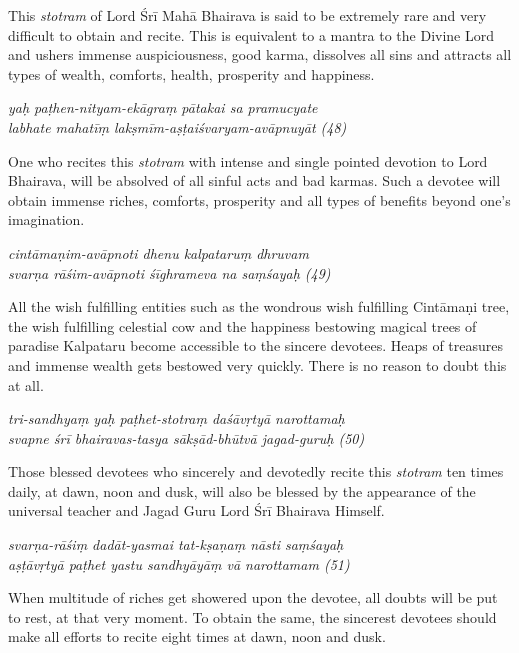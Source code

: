 \documentclass[11pt,oneside,a4paper]{article}
\newenvironment{shloka}[1]
  {\bigskip\center#1\varwidth{\linewidth}}
  {\endvarwidth\endcenter\bigskip}
\newcommand{\tl}[1]{\emph{#1}}
\begin{document}
This \tl{stotram} of Lord Śrī Mahā Bhairava is said to be extremely rare and
very difficult to obtain and recite. This is equivalent to a mantra to
the Divine Lord and ushers immense auspiciousness, good karma, dissolves all
sins and attracts all types of wealth, comforts, health, prosperity and
happiness.

\begin{shloka}\itshape
  yaḥ paṭhen-nityam-ekāgraṃ pātakai sa pramucyate\\
  labhate mahatīṃ lakṣmīm-aṣṭaiśvaryam-avāpnuyāt (48)
\end{shloka}

One who recites this \tl{stotram} with intense and single pointed devotion to
Lord Bhairava, will be absolved of all sinful acts and bad karmas. Such
a devotee will obtain immense riches, comforts, prosperity and all types of
benefits beyond one’s imagination.

\begin{shloka}\itshape
  cintāmaṇim-avāpnoti dhenu kalpataruṃ dhruvam\\
  svarṇa rāśim-avāpnoti śīghrameva na saṃśayaḥ (49)
\end{shloka}

All the wish fulfilling entities such as the wondrous wish fulfilling Cintāmaṇi
tree, the wish fulfilling celestial cow and the happiness bestowing magical
trees of paradise Kalpataru become accessible to the sincere devotees. Heaps of
treasures and immense wealth gets bestowed very quickly. There is no reason to
doubt this at all.

\begin{shloka}\itshape
  tri-sandhyaṃ yaḥ paṭhet-stotraṃ daśāvṛtyā narottamaḥ\\
  svapne śrī bhairavas-tasya sākṣād-bhūtvā jagad-guruḥ (50)
\end{shloka}

Those blessed devotees who sincerely and devotedly recite this \tl{stotram} ten
times daily, at dawn, noon and dusk, will also be blessed by the appearance of
the universal teacher and Jagad Guru Lord Śrī Bhairava Himself.

\begin{shloka}\itshape
  svarṇa-rāśiṃ dadāt-yasmai tat-kṣaṇaṃ nāsti saṃśayaḥ\\
  aṣṭāvṛtyā paṭhet yastu sandhyāyāṃ vā narottamam (51)
\end{shloka}

When multitude of riches get showered upon the devotee, all doubts will be put
to rest, at that very moment. To obtain the same, the sincerest devotees should
make all efforts to recite eight times at dawn, noon and dusk.
\end{document}
